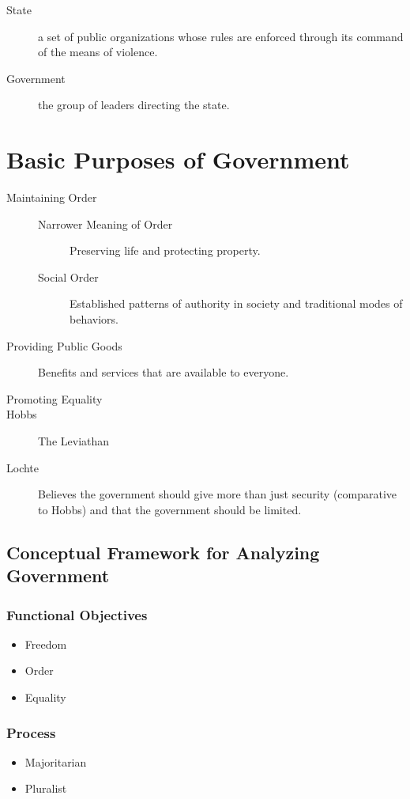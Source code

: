 \begin{description}
    \item[State] a set of public organizations whose rules are enforced through its command of the means of violence.
    \item[Government] the group of leaders directing the state.
\end{description}
\section{Basic Purposes of Government}
\begin{description}
    \item[Maintaining Order] \hfill
    \begin{description}
        \item[Narrower Meaning of Order] Preserving life and protecting property.
        \item[Social Order] Established patterns of authority in society and traditional modes of behaviors.
    \end{description}
    \item[Providing Public Goods] Benefits and services that are available to everyone.
    \item[Promoting Equality]
    \item[Hobbs] The Leviathan
    \item[Lochte] Believes the government should give more than just security (comparative to Hobbs) and that the government should be limited.
\end{description}
\subsection{Conceptual Framework for Analyzing Government}
\subsubsection{Functional Objectives}
\begin{itemize}
    \item Freedom
    \item Order
    \item Equality
\end{itemize}
\subsubsection{Process}
\begin{itemize}
    \item Majoritarian
    \item Pluralist
\end{itemize}
